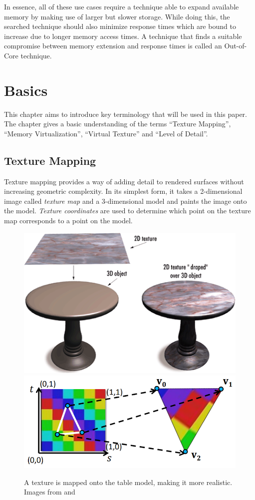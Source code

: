In essence, all of these use cases require a technique able to expand available memory by making use of larger but slower storage. While doing this, the searched technique should also minimize response times which are bound to increase due to longer memory access times. A technique that finds a suitable compromise between memory extension and response times is called an Out-of-Core technique.

\chapter{Basics}
\label{ch:Basics}

This chapter aims to introduce key terminology that will be used in this paper. The chapter gives a basic understanding of the terms ``Texture Mapping'', ``Memory Virtualization'', ``Virtual Texture'' and ``Level of Detail''.

\section{Texture Mapping}

Texture mapping provides a way of adding detail to rendered surfaces without increasing geometric complexity. In its simplest form, it takes a 2-dimensional image called \textit{texture map} and a 3-dimensional model and paints the image onto the model. \textit{Texture coordinates} are used to determine which point on the texture map corresponds to a point on the model.

\begin{figure}[h]
  \begin{center}
    \includegraphics[width=.3\textwidth]{logos/texture_mapping_example.png}
    \hfill
    \includegraphics[width=.5\textwidth]{logos/texture_coordinates_example.png}
    \caption{A texture is mapped onto the table model, making it more realistic. Images from \cite{TextMapExample} and \cite{CompGraphics:2017:04:TexMap}}
  \end{center}
\end{figure}

